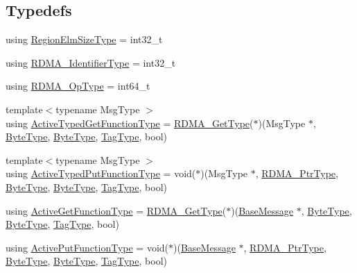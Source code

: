 \subsection*{Typedefs}
\begin{DoxyCompactItemize}
\item 
using \hyperlink{namespacevt_1_1rdma_ac07ef96e399913495fde1da0f83f684c}{Region\+Elm\+Size\+Type} = int32\+\_\+t
\item 
using \hyperlink{namespacevt_1_1rdma_a3b7f2eba1e9063a37d9301061c1432f1}{R\+D\+M\+A\+\_\+\+Identifier\+Type} = int32\+\_\+t
\item 
using \hyperlink{namespacevt_1_1rdma_a9b966d9780a2b41afe7cd7b7b4b20300}{R\+D\+M\+A\+\_\+\+Op\+Type} = int64\+\_\+t
\item 
{\footnotesize template$<$typename Msg\+Type $>$ }\\using \hyperlink{namespacevt_1_1rdma_a903d8f605dadc2456d4a1c6fcb83eda4}{Active\+Typed\+Get\+Function\+Type} = \hyperlink{namespacevt_a1cab7f4860f65a49ad2c042d6240f288}{R\+D\+M\+A\+\_\+\+Get\+Type}($\ast$)(Msg\+Type $\ast$, \hyperlink{namespacevt_aab8d55968084610ce3b17057981e9300}{Byte\+Type}, \hyperlink{namespacevt_aab8d55968084610ce3b17057981e9300}{Byte\+Type}, \hyperlink{namespacevt_a84ab281dae04a52a4b243d6bf62d0e52}{Tag\+Type}, bool)
\item 
{\footnotesize template$<$typename Msg\+Type $>$ }\\using \hyperlink{namespacevt_1_1rdma_a56f7eb7ecfa7e6824d3abb4afb634a37}{Active\+Typed\+Put\+Function\+Type} = void($\ast$)(Msg\+Type $\ast$, \hyperlink{namespacevt_aab05b4a584f7ee835a6d0f66915cf59b}{R\+D\+M\+A\+\_\+\+Ptr\+Type}, \hyperlink{namespacevt_aab8d55968084610ce3b17057981e9300}{Byte\+Type}, \hyperlink{namespacevt_aab8d55968084610ce3b17057981e9300}{Byte\+Type}, \hyperlink{namespacevt_a84ab281dae04a52a4b243d6bf62d0e52}{Tag\+Type}, bool)
\item 
using \hyperlink{namespacevt_1_1rdma_af564945ba7e35e15bccfb9c2a8d7ebd7}{Active\+Get\+Function\+Type} = \hyperlink{namespacevt_a1cab7f4860f65a49ad2c042d6240f288}{R\+D\+M\+A\+\_\+\+Get\+Type}($\ast$)(\hyperlink{namespacevt_ac34f95a5e2b8109b55bfba52b074443d}{Base\+Message} $\ast$, \hyperlink{namespacevt_aab8d55968084610ce3b17057981e9300}{Byte\+Type}, \hyperlink{namespacevt_aab8d55968084610ce3b17057981e9300}{Byte\+Type}, \hyperlink{namespacevt_a84ab281dae04a52a4b243d6bf62d0e52}{Tag\+Type}, bool)
\item 
using \hyperlink{namespacevt_1_1rdma_a9adc598d6d34e2ed3c143711992674d8}{Active\+Put\+Function\+Type} = void($\ast$)(\hyperlink{namespacevt_ac34f95a5e2b8109b55bfba52b074443d}{Base\+Message} $\ast$, \hyperlink{namespacevt_aab05b4a584f7ee835a6d0f66915cf59b}{R\+D\+M\+A\+\_\+\+Ptr\+Type}, \hyperlink{namespacevt_aab8d55968084610ce3b17057981e9300}{Byte\+Type}, \hyperlink{namespacevt_aab8d55968084610ce3b17057981e9300}{Byte\+Type}, \hyperlink{namespacevt_a84ab281dae04a52a4b243d6bf62d0e52}{Tag\+Type}, bool)

\end{DoxyCompactItemize}
